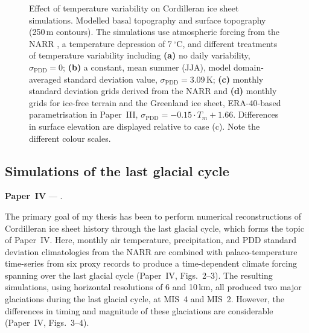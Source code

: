\documentclass{article}
\newcommand{\sPDD}[0]{\sigma_{\mathrm{PDD}}}
\newcommand{\unit}[1]{\ensuremath{\mathrm{#1}}}
\newcommand{\degree}[0]{\ensuremath{^{\circ}}}
\newcommand{\degC}[0]{\unit{{\degree}C}}
\newcommand{\PSDP}[0]{Paper~III}    %
\newcommand{\CCYC}[0]{Paper~IV}     %
\begin{document}
\begin{figure}
  \centering
  \caption{Effect of temperature variability on Cordilleran ice sheet
           simulations. Modelled basal topography and surface topography
           (250\,m contours). The simulations use atmospheric forcing from the
           NARR \citep{Mesinger.etal.2006}, a temperature depression of
           7\,\degC, and different treatments of temperature variability
           including
           \textbf{(a)} no daily variability, $\sPDD=0$;
           \textbf{(b)} a constant, mean summer (JJA), model domain-averaged
           standard deviation value, $\sPDD=3.09$\,K;
           \textbf{(c)} monthly standard deviation grids derived from the NARR
           and
           \textbf{(d)} monthly grids for ice-free terrain and the
           Greenland ice sheet, ERA-40-based \citep{Uppala.etal.2005}
           parametrisation in \PSDP, ${\sPDD=-0.15\cdot{T_m}+1.66}$.
           Differences in surface elevation are displayed relative to case (c).
           Note the different colour scales.}
  \label{fig:plot-sdeffect}
\end{figure}


\subsection{Simulations of the last glacial cycle}

\noindent\textbf{\CCYC} --- .
\bigskip

The primary goal of my thesis has been to perform numerical reconstructions
of Cordilleran ice sheet history through the last glacial cycle, which forms
the topic of \CCYC.
Here, monthly air temperature, precipitation, and PDD standard deviation
climatologies from the NARR are combined with palaeo-temperature time-series
from six proxy records to produce a time-dependent climate forcing
spanning over the last glacial cycle (\CCYC,
Figs.~2--3). The resulting simulations, using horizontal resolutions of 6 and
10\,km, all produced two major glaciations during the last glacial cycle, at
MIS~4 and MIS~2. However, the differences in timing and magnitude of these
glaciations are considerable (\CCYC, Figs.~3--4).
\end{document}
